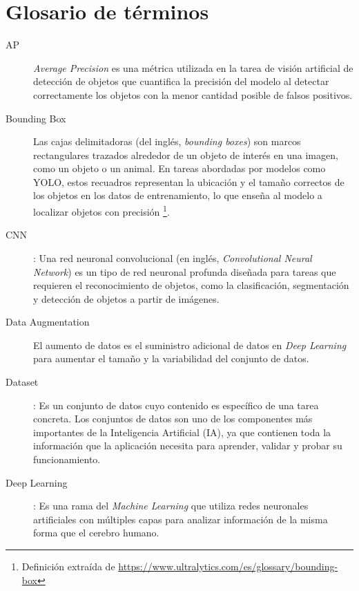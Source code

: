 \documentclass[12pt,a4paper,onecolumn,oneside]{report}
\newcommand{\mychapter}[2]{
	\setcounter{chapter}{#1}
	\setcounter{section}{0}
	\chapter*{#2}
	\addcontentsline{toc}{chapter}{#2}
}
\begin{document}
\listoftables



\mychapter{0}{Glosario de términos}
\label{chap:glosario}
\pagestyle{headings}


\begin{description}

\item[AP] \textit{Average Precision} es una métrica utilizada en la tarea de visión artificial de detección de objetos que cuantifica la precisión del modelo al detectar correctamente los objetos con la menor cantidad posible de falsos positivos.

\item[Bounding Box] Las cajas delimitadoras (del inglés, \textit{bounding boxes}) son marcos rectangulares trazados alrededor de un objeto de interés en una imagen, como un objeto o un animal. En tareas abordadas por modelos como YOLO, estos recuadros representan la ubicación y el tamaño correctos de los objetos en los datos de entrenamiento, lo que enseña al modelo a localizar objetos con precisión \footnote{Definición extraída de \url{https://www.ultralytics.com/es/glossary/bounding-box}}.

\item[CNN]: Una red neuronal convolucional (en inglés, \textit{Convolutional Neural Network}) es un tipo de red neuronal profunda diseñada para tareas que requieren el reconocimiento de objetos, como la clasificación, segmentación y detección de objetos a partir de imágenes.

\item[Data Augmentation] El aumento de datos es el suministro adicional de datos en \textit{Deep Learning} para aumentar el tamaño y la variabilidad del conjunto de datos.

\item[Dataset]: Es un conjunto de datos cuyo contenido es específico de una tarea concreta. Los conjuntos de datos son uno de los componentes más importantes de la Inteligencia Artificial (IA), ya que contienen toda la información que la aplicación necesita para aprender, validar y probar su funcionamiento.

\item[Deep Learning]: Es una rama del \textit{Machine Learning} que utiliza redes neuronales artificiales con múltiples capas para analizar información de la misma forma que el cerebro humano.


\end{description}
\end{document}
